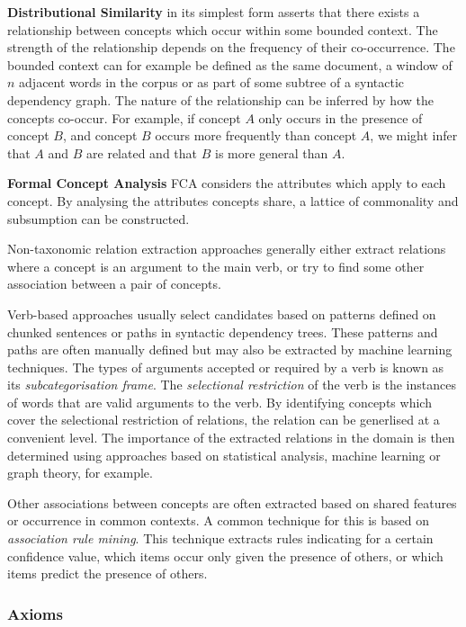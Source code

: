 \documentclass[a4paper]{report}
\begin{document}
{\bfseries Distributional Similarity} in its simplest form asserts that there exists a relationship between concepts which occur within some bounded context.
The strength of the relationship depends on the frequency of their co-occurrence.
The bounded context can for example be defined as the same document, a window of $n$ adjacent words in the corpus or as part of some subtree of a syntactic dependency graph.
The nature of the relationship can be inferred by how the concepts co-occur.
For example, if concept $A$ only occurs in the presence of concept $B$, and concept $B$ occurs more frequently than concept $A$, we might infer that $A$ and $B$ are related and that $B$ is more general than $A$.

{\bfseries Formal Concept Analysis} 
FCA considers the attributes which apply to each concept.
By analysing the attributes concepts share, a lattice of commonality and subsumption can be constructed.

\medskip

Non-taxonomic relation extraction approaches generally either extract relations where a concept is an argument to the main verb, or try to find some other association between a pair of concepts.

Verb-based approaches usually select candidates based on patterns defined on chunked sentences or paths in syntactic dependency trees.
These patterns and paths are often manually defined but may also be extracted by machine learning techniques.
The types of arguments accepted or required by a verb is known as its \emph{subcategorisation frame}.
The \emph{selectional restriction} of the verb is the instances of words that are valid arguments to the verb.
By identifying concepts which cover the selectional restriction of relations, the relation can be generlised at a convenient level.
The importance of the extracted relations in the domain is then determined using approaches based on statistical analysis, machine learning or graph theory, for example.

Other associations between concepts are often extracted based on shared features or occurrence in common contexts.
A common technique for this is based on \emph{association rule mining}.
This technique extracts rules indicating for a certain confidence value, which items occur only given the presence of others, or which items predict the presence of others.

\subsubsection{Axioms}
\end{document}
